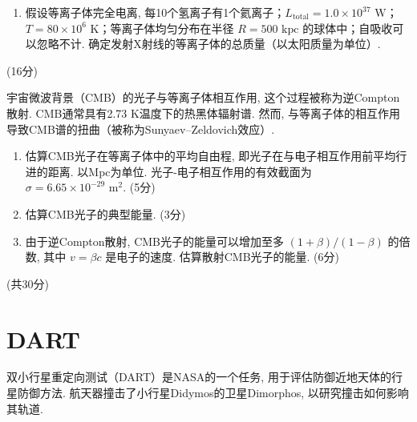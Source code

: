 \documentclass[a4paper,fontset=fandol]{ctexart}
\newcommand{\points}[1]{\par %
	\noindent %
	\hfill (#1分)%
	\vspace{1em}
	}
\begin{document}
	\begin{enumerate}[label=(\alph*)]
		\item 假设等离子体完全电离, 每10个氢离子有1个氦离子；\( L_\mathrm{total} = 1.0 \times 10^{37} \text{ W} \)；\( T = 80 \times 10^6 \text{ K} \)；等离子体均匀分布在半径 \( R = 500 \text{ kpc} \) 的球体中；自吸收可以忽略不计. 确定发射X射线的等离子体的总质量（以太阳质量为单位）. 
	\end{enumerate}
	\points{16}
	
	\vspace{-0em}
	宇宙微波背景（CMB）的光子与等离子体相互作用, 这个过程被称为逆Compton散射. CMB通常具有2.73 K温度下的热黑体辐射谱. 然而, 与等离子体的相互作用导致CMB谱的扭曲（被称为Sunyaev–Zeldovich效应）. 
	
	\begin{enumerate}[label=(\alph*),start=2]
		\item 估算CMB光子在等离子体中的平均自由程, 即光子在与电子相互作用前平均行进的距离. 以Mpc为单位. 光子-电子相互作用的有效截面为 \(\sigma = 6.65 \times 10^{-29} \text{ m}^2\). \hfill(5分)
		
		\item 估算CMB光子的典型能量. \hfill(3分)
		
		\item 由于逆Compton散射, CMB光子的能量可以增加至多 \( (1+\beta)/(1-\beta) \) 的倍数, 其中 \( v = \beta c \) 是电子的速度. 估算散射CMB光子的能量. \hfill(6分)
	\end{enumerate}
	
	\points{共30}
	
	\section{DART}
	
	双小行星重定向测试（DART）是NASA的一个任务, 用于评估防御近地天体的行星防御方法. 航天器撞击了小行星Didymos的卫星Dimorphos, 以研究撞击如何影响其轨道. 
	
\end{document}
